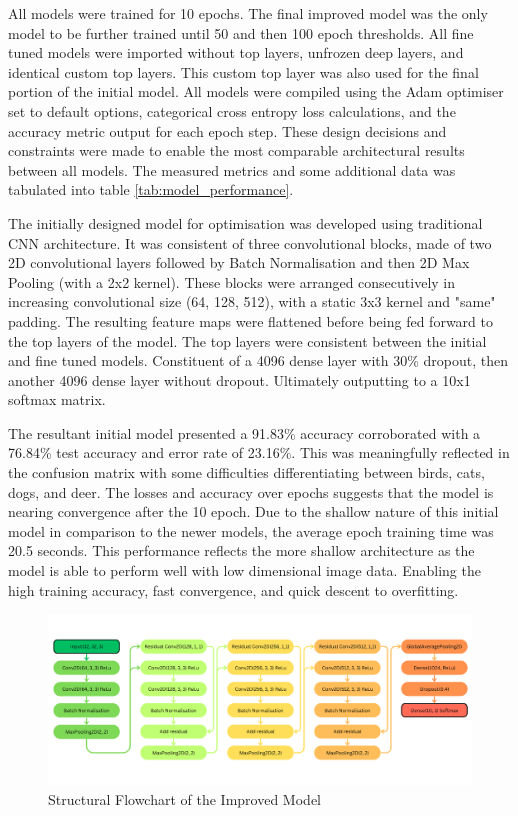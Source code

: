 \documentclass[10pt,twocolumn,letterpaper]{article}
\begin{document}
All models were trained for 10 epochs. The final improved model was the only model to be further trained until 50 and then 100 epoch thresholds. All fine tuned models were imported without top layers, unfrozen deep layers, and identical custom top layers. This custom top layer was also used for the final portion of the initial model. All models were compiled using the Adam optimiser set to default options, categorical cross entropy loss calculations, and the accuracy metric output for each epoch step. These design decisions and constraints were made to enable the most comparable architectural results between all models. The measured metrics and some additional data was tabulated into table \ref{tab:model_performance}. 

The initially designed model for optimisation was developed using traditional CNN architecture. It was consistent of three convolutional blocks, made of two 2D convolutional layers followed by Batch Normalisation and then 2D Max Pooling (with a 2x2 kernel). These blocks were arranged consecutively in increasing convolutional size (64, 128, 512), with a static 3x3 kernel and "same" padding. The resulting feature maps were flattened before being fed forward to the top layers of the model. The top layers were consistent between the initial and fine tuned models. Constituent of a 4096 dense layer with 30\% dropout, then another 4096 dense layer without dropout. Ultimately outputting to a 10x1 softmax matrix. 

The resultant initial model presented a 91.83\% accuracy corroborated with a 76.84\% test accuracy and error rate of 23.16\%. This was meaningfully reflected in the confusion matrix with some difficulties differentiating between birds, cats, dogs, and deer. The losses and accuracy over epochs suggests that the model is nearing convergence after the 10 epoch. Due to the shallow nature of this initial model in comparison to the newer models, the average epoch training time was 20.5 seconds. This performance reflects the more shallow architecture as the model is able to perform well with low dimensional image data. Enabling the high training accuracy, fast convergence, and quick descent to overfitting. 

\begin{figure}[ht]
    \centering
    \includegraphics[width=1 \textwidth, height=0.31 \textheight]{Improved Model Flowchart.png}
    \caption{Structural Flowchart of the Improved Model}
    \label{fig:improved model}
\end{figure}
\end{document}
